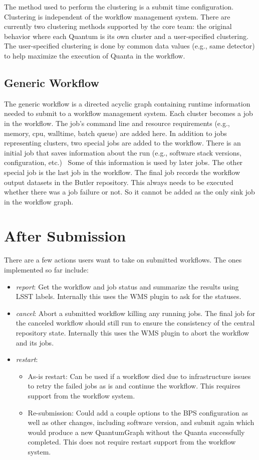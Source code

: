 \documentclass[11pt,twoside]{article}
\begin{document}
The method used to perform the clustering is a submit time configuration.
Clustering is independent of the workflow management system.  There
are currently two clustering methods supported by the core team: the
original behavior where each Quantum is its own cluster and a user-specified
clustering.  The user-specified clustering is done by common data values
(e.g., same detector) to help maximize the execution of Quanta in the
workflow.

\subsection{Generic Workflow} \label{generic_workflow}
The generic workflow is a directed acyclic graph containing runtime
information needed to submit to a workflow management system.  Each
cluster becomes a job in the workflow.  The job's command line and
resource requirements (e.g., memory, cpu, walltime, batch queue) are
added here.  In addition to jobs representing clusters, two special jobs
are added to the workflow.  There is an initial job that saves information
about the run (e.g., software stack versions, configuration, etc.)~  Some
of this information is used by later jobs.  The other special job is the
last job in the workflow.  The final job records the workflow output
datasets in the Butler repository.  This always needs to be executed
whether there was a job failure or not.  So it cannot be added as the
only sink job in the workflow graph.

\section{After Submission}
There are a few actions users want to take on submitted workflows.  The
ones implemented so far include:

\begin{itemize}
\item  \textit{report}: Get the workflow and job status and summarize
the results using LSST labels.  Internally this uses the WMS plugin to
ask for the statuses.

\item \textit{cancel}: Abort a submitted workflow killing any running
jobs.  The final job for the canceled workflow should still run to ensure
the consistency of the central repository state.  Internally this uses
the WMS plugin to abort the workflow and its jobs.

\item \textit{restart}:
\begin{itemize}
\item As-is restart: Can be used if a workflow died due to infrastructure
issues to retry the failed jobs as is and continue the workflow.
This requires support from the workflow system.

\item Re-submission: Could add a couple options to the BPS configuration
as well as other changes, including software version, and submit again
which would produce a new QuantumGraph without the Quanta successfully
completed.  This does not require restart support from the workflow
system.
\end{itemize}
\end{itemize}
\end{document}
